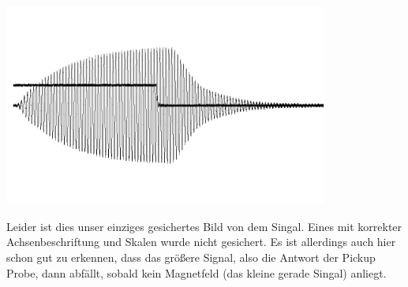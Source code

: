 \documentclass[10pt]{article}
\newenvironment{Figure}
  {\par\medskip\noindent\minipage{\linewidth}}
  {\endminipage\par\medskip}
\begin{document}
\begin{multicols}{2}
\begin{Figure}
		\centering\includegraphics[width=0.8\textwidth]{scope_0.png}
		\label{fig:PP}
	\end{Figure}
Leider ist dies unser einziges gesichertes Bild von dem Singal. Eines mit korrekter Achsenbeschriftung und Skalen wurde nicht gesichert. Es ist allerdings auch hier schon gut zu erkennen, dass das größere Signal, also die Antwort der Pickup Probe, dann abfällt, sobald kein Magnetfeld (das kleine gerade Singal) anliegt.


\end{multicols}
\end{document}
